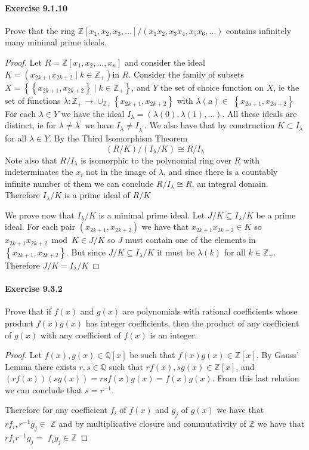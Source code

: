 \documentclass{article}
\theoremstyle{definition}
\begin{document}
\paragraph{Exercise 9.1.10} Prove that the ring $\mathbb{Z}\left[x_{1}, x_{2}, x_{3}, \ldots\right] /\left(x_{1} x_{2}, x_{3} x_{4}, x_{5} x_{6}, \ldots\right)$ contains infinitely many minimal prime ideals.
\begin{proof}
    Let $R=\mathbb{Z}\left[x_1, x_2, \ldots, x_n\right]$ and consider the ideal $K=\left(x_{2 k+1} x_{2 k+2} \mid k \in \mathbb{Z}_{+}\right)$in $R$.
Consider the family of subsets $X=\left\{\left\{x_{2 k+1}, x_{2 k+2}\right\} \mid k \in \mathbb{Z}_{+}\right\}$, and $Y$ the set of choice function on $X$, ie the set of functions $\lambda: \mathbb{Z}_{+} \rightarrow \cup_{\mathbb{Z}_{+}}\left\{x_{2 k+1}, x_{2 k+2}\right\}$ with $\lambda(a) \in$ $\left\{x_{2 a+1}, x_{2 a+2}\right\}$
For each $\lambda \in Y$ we have the ideal $I_\lambda=(\lambda(0), \lambda(1), \ldots)$.
All these ideals are distinct, ie for $\lambda \neq \lambda^{\prime}$ we have $I_\lambda \neq I_{\lambda^{\prime}}$.
We also have that by construction $K \subset I_\lambda$ for all $\lambda \in Y$.
By the Third Isomorphism Theorem
$$
(R / K) /\left(I_\lambda / K\right) \cong R / I_\lambda
$$
Note also that $R / I_\lambda$ is isomorphic to the polynomial ring over $R$ with indeterminates the $x_i$ not in the image of $\lambda$, and since there is a countably infinite number of them we can conclude $R / I_\lambda \cong R$, an integral domain. Therefore $I_\lambda / K$ is a prime ideal of $R / K$

We prove now that $I_\lambda / K$ is a minimal prime ideal. Let $J / K \subseteq I_\lambda / K$ be a prime ideal. For each pair $\left(x_{2 k+1}, x_{2 k+2}\right)$ we have that $x_{2 k+1} x_{2 k+2} \in K$ so $x_{2 k+1} x_{2 k+2} \bmod K \in J / K$ so $J$ must contain one of the elements in $\left\{x_{2 k+1}, x_{2 k+2}\right\}$. But since $J / K \subseteq I_\lambda / K$ it must be $\lambda(k)$ for all $k \in \mathbb{Z}_{+}$. Therefore $J / K=I_\lambda / K$
\end{proof}



\paragraph{Exercise 9.3.2} Prove that if $f(x)$ and $g(x)$ are polynomials with rational coefficients whose product $f(x) g(x)$ has integer coefficients, then the product of any coefficient of $g(x)$ with any coefficient of $f(x)$ is an integer.
\begin{proof}
    Let $f(x), g(x) \in \mathbb{Q}[x]$ be such that $f(x) g(x) \in \mathbb{Z}[x]$.
By Gauss' Lemma there exists $r, s \in \mathbb{Q}$ such that $r f(x), s g(x) \in \mathbb{Z}[x]$, and $(r f(x))(s g(x))=r s f(x) g(x)=f(x) g(x)$. From this last relation we can conclude that $s=r^{-1}$.

Therefore for any coefficient $f_i$ of $f(x)$ and $g_j$ of $g(x)$ we have that $r f_i, r^{-1} g_j \in$ $\mathbb{Z}$ and by multiplicative closure and commutativity of $\mathbb{Z}$ we have that $r f_i r^{-1} g_j=$ $f_i g_j \in \mathbb{Z}$
\end{proof}
\end{document}
